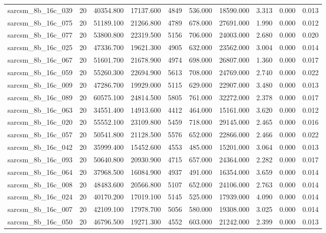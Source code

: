 \begin{tabular}{lrrrrrrrrr}
sarcsm\_8b\_16c\_039 & 20 & 40354.800 & 17137.600 & 4849 & 536.000 & 18590.000 & 3.313 & 0.000 & 0.013 \\
sarcsm\_8b\_16c\_075 & 20 & 51189.100 & 21266.800 & 4789 & 678.000 & 27691.000 & 1.990 & 0.000 & 0.012 \\
sarcsm\_8b\_16c\_077 & 20 & 53800.800 & 22319.500 & 5156 & 706.000 & 24003.000 & 2.680 & 0.000 & 0.020 \\
sarcsm\_8b\_16c\_025 & 20 & 47336.700 & 19621.300 & 4905 & 632.000 & 23562.000 & 3.004 & 0.000 & 0.014 \\
sarcsm\_8b\_16c\_067 & 20 & 51601.700 & 21678.900 & 4974 & 698.000 & 26807.000 & 1.360 & 0.000 & 0.017 \\
sarcsm\_8b\_16c\_059 & 20 & 55260.300 & 22694.900 & 5613 & 708.000 & 24769.000 & 2.740 & 0.000 & 0.022 \\
sarcsm\_8b\_16c\_009 & 20 & 47286.700 & 19929.000 & 5115 & 629.000 & 22907.000 & 3.480 & 0.000 & 0.013 \\
sarcsm\_8b\_16c\_089 & 20 & 60575.100 & 24814.500 & 5805 & 761.000 & 32272.000 & 2.378 & 0.000 & 0.017 \\
sarcsm\_8b\_16c\_063 & 20 & 34551.400 & 14913.600 & 4412 & 464.000 & 15161.000 & 3.620 & 0.000 & 0.012 \\
sarcsm\_8b\_16c\_020 & 20 & 55552.100 & 23109.800 & 5459 & 718.000 & 29145.000 & 2.465 & 0.000 & 0.016 \\
sarcsm\_8b\_16c\_057 & 20 & 50541.800 & 21128.500 & 5576 & 652.000 & 22866.000 & 2.466 & 0.000 & 0.022 \\
sarcsm\_8b\_16c\_042 & 20 & 35999.400 & 15452.600 & 4553 & 485.000 & 15201.000 & 3.064 & 0.000 & 0.013 \\
sarcsm\_8b\_16c\_093 & 20 & 50640.800 & 20930.900 & 4715 & 657.000 & 24364.000 & 2.282 & 0.000 & 0.017 \\
sarcsm\_8b\_16c\_064 & 20 & 37968.500 & 16084.900 & 4937 & 491.000 & 16354.000 & 3.659 & 0.000 & 0.014 \\
sarcsm\_8b\_16c\_008 & 20 & 48483.600 & 20566.800 & 5107 & 652.000 & 24106.000 & 2.763 & 0.000 & 0.014 \\
sarcsm\_8b\_16c\_024 & 20 & 40170.200 & 17019.100 & 5145 & 525.000 & 17939.000 & 4.090 & 0.000 & 0.014 \\
sarcsm\_8b\_16c\_007 & 20 & 42109.100 & 17978.700 & 5056 & 580.000 & 19308.000 & 3.025 & 0.000 & 0.014 \\
sarcsm\_8b\_16c\_050 & 20 & 46796.500 & 19271.300 & 4552 & 603.000 & 21242.000 & 2.399 & 0.000 & 0.013 \\

\end{tabular}
